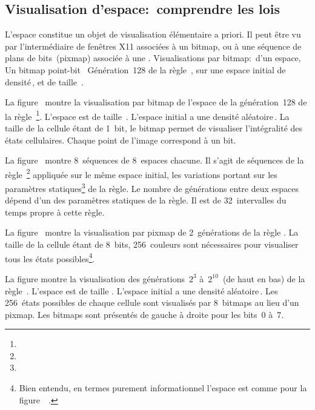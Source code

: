 \subsection{Visualisation d'espace:~comprendre les lois}

L'espace constitue un objet de visualisation \'el\'ementaire a priori. %
Il peut \^etre vu par l'interm\'ediaire de fen\^etres X11 associ\'ees \`a un
bitmap, ou \`a une s\'equence de plans de bits~(pixmap) associ\'ee \`a une
.
%
{Visualisations par bitmap:~d'un espace,}%
{Un bitmap point-bit~}%
{G\'en\'eration~128 de la r\`egle~, sur une espace initial de
  densit\'e\,\Sundemi, et de taille~.}

\noindent%
La figure~ montre la visualisation par
bitmap de l'espace de la g\'en\'e\-ration~128 de la
r\`egle~\footnote{%
  }. %
L'espace est de taille~. %
L'espace initial a une densit\'e al\'eatoire\,\undemi. %
La taille de la cellule \'etant de 1~bit, le bitmap permet de visualiser
l'int\'egralit\'e des \'etats cellulaires. %
Chaque point de l'image correspond \`a un bit.

\noindent%
La figure~ montre 8~s\'equences de
8~espaces chacune. %
Il s'agit de s\'equences de la r\`egle~\footnote{%
  } %
appliqu\'ee sur le m\^eme espace initial, les variations portant sur les
param\`etres statiques\footnote{%
  } %
de la r\`egle. %
Le nombre de g\'en\'erations entre deux espaces d\'epend d'un des param\`etres
statiques de la r\`egle. %
Il est de 32~intervalles du temps propre \`a cette r\`egle.

\noindent%
La figure~ montre la visualisation par pixmap de
2~g\'en\'erations de la r\`egle  . %
La taille de la cellule \'etant de 8~bits, 256~couleurs sont n\'ecessaires
pour visualiser tous les \'etats possibles\footnote{%
  Bien entendu, en termes purement informationnel l'espace est comme
  pour la  figure~~.}.

\noindent%
La figure  montre la visualisation des
g\'en\'erations~$2^{3}$ \`a~$2^{10}$~(de haut en bas) de la
r\`egle~. %
L'espace est de taille . %
L'espace initial a une densit\'e al\'eatoire\,\undemi. %
Les 256~\'etats possibles de chaque cellule sont visualis\'es par
8~bitmaps au lieu d'un pixmap. %
Les bitmaps sont pr\'esent\'es de gauche \`a droite pour les bits~0 \`a~7.

